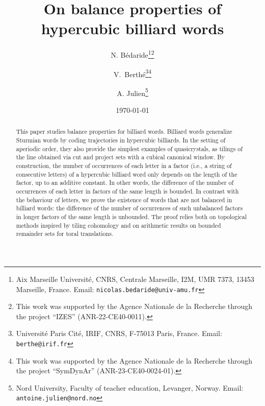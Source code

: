 \documentclass{article}
\title{On balance properties of  hypercubic  billiard   words}
\author{N. Bédaride\footnote{
    Aix Marseille Université, CNRS,
    Centrale Marseille, I2M, UMR 7373, 13453 Marseille, France.
    Email: \texttt{nicolas.bedaride@univ-amu.fr}}\thanks{ This work was supported by the Agence Nationale de la Recherche  through the project  ``IZES''  (ANR-22-CE40-0011).} 
 \and
 V.~Berth\'e\footnote{Universit\'e  Paris Cit\'e, IRIF, CNRS, 
F-75013 Paris, France. Email: \texttt{berthe@irif.fr}}\thanks{ This work was supported by the Agence Nationale de la Recherche  through the project  ``SymDynAr''  (ANR-23-CE40-0024-01).}
 \and
A. Julien\footnote{Nord University,     Faculty of teacher education, Levanger, Norway. Email:
\texttt{antoine.julien@nord.no}}}
\date{\today}
\theoremstyle{definition}
\begin{document}
 



\maketitle

\begin{abstract}
This  paper studies balance properties for billiard words.  Billiard words generalize Sturmian words by coding trajectories in hypercubic billiards.
In the setting of  aperiodic order,   they also provide the simplest examples of quasicrystals, as  tilings of the line  obtained  via      cut and project sets with a cubical canonical window.  
  By construction, the number of occurrences of each letter in a  factor  (i.e., a string of consecutive letters) of a hypercubic billiard word  only depends on the length of the factor,  up to an additive constant.  In other words, the difference of the number of occurrences of each letter in factors  of the same length is bounded.
 In contrast with the behaviour of letters, we prove the existence of words  that are not balanced in   billiard words:  the difference of the number of occurrences of such  unbalanced   factors in  longer factors  of the same length is unbounded.  The proof relies  both on topological methods inspired by tiling  cohomology and  on  arithmetic results on bounded remainder sets for toral translations.
\end{abstract}


\end{document}
